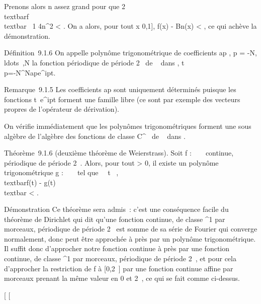 Prenons alors n assez grand pour que
2\\textbar{}f\\textbar{}\infty~ 1
\over 4n\delta^2 \textless{} \epsilon
{} . On a alors, pour tout x \in {[}0,1{]},
\textbar{}f(x) - Bn(x)\textbar{} \textless{} \epsilon, ce qui achève
la démonstration.

Définition~9.1.6 On appelle polynôme trigonométrique de coefficients
ap \in {}, p =
-N,\\ldots~,N la
fonction périodique de période 2\pi~ de ~ dans ,
t\mapsto~\\\sum
 p=-N^Nape^ipt.

Remarque~9.1.5 Les coefficients ap sont uniquement déterminés
puisque les fonctions t\mapsto~e^ipt
forment une famille libre (ce sont par exemple des vecteurs propres de
l'opérateur de dérivation).

On vérifie immédiatement que les polynômes trigonométriques forment une
sous algèbre de l'algèbre des fonctions de classe C^\infty~ de ~
dans .

Théorème~9.1.6 (deuxième théorème de Weierstrass). Soit f : ~ \rightarrow~ 
continue, périodique de période 2\pi~. Alors, pour tout \epsilon \textgreater{} 0,
il existe un polynôme trigonométrique g : ~ \rightarrow~  tel que
\forall~~t \in {}~, \\textbar{}f(t) -
g(t)\\textbar{} \textless{} \epsilon.

Démonstration Ce théorème sera admis~: c'est une conséquence facile du
théorème de Dirichlet qui dit qu'une fonction continue, de classe
^1 par morceaux, périodique de période 2\pi~ est somme de sa
série de Fourier qui converge normalement, donc peut être approchée à 
\epsilon {} près par un polynôme trigonométrique. Il
suffit donc d'approcher notre fonction continue à  \epsilon
{} près par une fonction continue, de classe
^1 par morceaux, périodique de période 2\pi~, et pour cela
d'approcher la restriction de f à {[}0,2\pi~{]} par une fonction continue
affine par morceaux prenant la même valeur en 0 et 2\pi~, ce qui se fait
comme ci-dessus.

{[}
{[}
